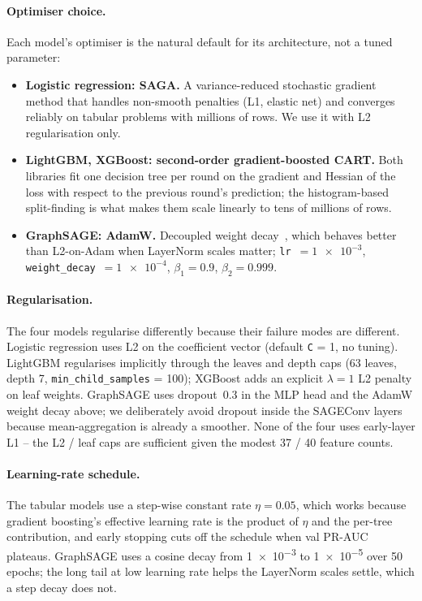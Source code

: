 \paragraph{Optimiser choice.} Each model's optimiser is the natural default for its architecture, not a tuned parameter:
\begin{itemize}
    \item \textbf{Logistic regression: SAGA.} A variance-reduced stochastic gradient method that handles non-smooth penalties (L1, elastic net) and converges reliably on tabular problems with millions of rows. We use it with L2 regularisation only.
    \item \textbf{LightGBM, XGBoost: second-order gradient-boosted CART.} Both libraries fit one decision tree per round on the gradient and Hessian of the loss with respect to the previous round's prediction; the histogram-based split-finding is what makes them scale linearly to tens of millions of rows.
    \item \textbf{GraphSAGE: AdamW.} Decoupled weight decay~\cite{loshchilov2019decoupled}, which behaves better than L2-on-Adam when LayerNorm scales matter; \texttt{lr}~$=\num{1e-3}$, \texttt{weight\_decay}~$=\num{1e-4}$, $\beta_1=\num{0.9}$, $\beta_2=\num{0.999}$.
\end{itemize}

\paragraph{Regularisation.} The four models regularise differently because their failure modes are different. Logistic regression uses L2 on the coefficient vector (default \texttt{C} = 1, no tuning). LightGBM regularises implicitly through the leaves and depth caps (63 leaves, depth 7, \texttt{min\_child\_samples} = 100); XGBoost adds an explicit $\lambda = 1$ L2 penalty on leaf weights. GraphSAGE uses dropout~\num{0.3} in the MLP head and the AdamW weight decay above; we deliberately avoid dropout inside the SAGEConv layers because mean-aggregation is already a smoother. None of the four uses early-layer L1 -- the L2 / leaf caps are sufficient given the modest 37 / 40 feature counts.

\paragraph{Learning-rate schedule.} The tabular models use a step-wise constant rate $\eta = \num{0.05}$, which works because gradient boosting's effective learning rate is the product of $\eta$ and the per-tree contribution, and early stopping cuts off the schedule when val PR-AUC plateaus. GraphSAGE uses a cosine decay from \num{1e-3} to \num{1e-5} over 50 epochs; the long tail at low learning rate helps the LayerNorm scales settle, which a step decay does not.

